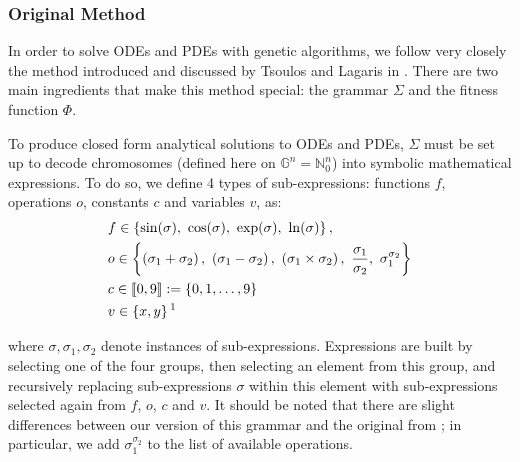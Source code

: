 \documentclass[aps,reprint,superscriptaddress,nofootinbib]{revtex4-2}
\begin{document}
\subsubsection{Original Method}

In order to solve ODEs and PDEs with genetic algorithms, we follow very closely the method introduced and discussed by Tsoulos and Lagaris in \cite{solving_diff_reproduce}. There are two main ingredients that make this method special: the grammar \(\Sigma\) and the fitness function \(\Phi\).

To produce closed form analytical solutions to ODEs and PDEs, \(\Sigma\) must be set up to decode chromosomes (defined here on \(\mathbb{G}^n = \mathbb{N}_0^n\)) into symbolic mathematical expressions. To do so, we define 4 types of sub-expressions: functions \(f\), operations \(o\), constants \(c\) and variables \(v\), as:
\begin{align*}
    &f\in \left\{\sin(\sigma),~\cos(\sigma),~\exp(\sigma),~\ln(\sigma)\right\},
    \\
    &o\in \left\{\left(\sigma_1+\sigma_2\right),~\left(\sigma_1-\sigma_2\right),~\left(\sigma_1\times\sigma_2\right),~\frac{\sigma_1}{\sigma_2},~\sigma_1^{\sigma_2}\right\}
    \\
    &c\in \llbracket0,9\rrbracket := \{0,1,\ldots,9\} %
    \\
    &v\in \left\{x, y\right\}\text{\footnotemark}
\end{align*}
\addtocounter{footnote}{-1}
where \(\sigma, \sigma_1, \sigma_2\) denote instances of sub-expressions.
Expressions are built by selecting one of the four groups, then selecting an element from this group, and recursively replacing sub-expressions \(\sigma\) within this element with sub-expressions selected again from \(f\), \(o\), \(c\) and \(v\).
It should be noted that there are slight differences between our version of this grammar and the original from \cite{solving_diff_reproduce}; in particular, we add \(\sigma_1^{\sigma_2}\) to the list of available operations.
\end{document}
